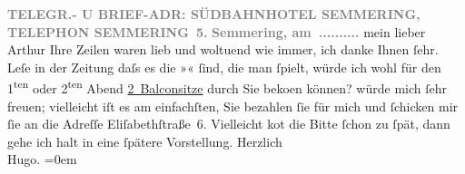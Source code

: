 \begin{ledgroupsized}[t]{13cm}
           \pstart
           \centering{}\textcolor{gray}{\textbf{TELEGR.- U BRIEF-ADR: SÜDBAHNHOTEL SEMMERING, TELEPHON SEMMERING 5.}}\pend
           \pstart
           \noindent{}\raggedleft{}\textcolor{gray}{\textbf{Semmering, am ..........}}\pend
           \pstart{}mein lieber Arthur \pend\pstart
           Ihre Zeilen waren lieb und woltuend wie immer, ich danke Ihnen ſehr.\pend
           \pstart
           Leſe in der Zeitung daſs es die »\label{K_L02053_1v}\label{K_L02053_1h}« ſind, die man ſpielt, würde ich wohl für
               den 1\textsuperscript{ten}{ }{\pb}oder 2\textsuperscript{ten} Abend \uline{2 Balconsitze} durch Sie beko{\geminationm}en können? würde mich ſehr freuen; vielleicht iſt es am
               einfachſten, Sie bezahlen ſie für mich und ſchicken mir ſie an die Adreſſe Eliſabethſtraße 6.\pend
           \pstart
           Vielleicht ko{\geminationm}t die Bitte ſchon zu ſpät, dann gehe ich
               halt in eine ſpätere Vorstellung.\pend
           \pstart
           Herzlich{\\[\baselineskip]}\spacefill\mbox{Hugo.}\pend
           \leftskip=0em{}\endnumbering{}\end{ledgroupsized}  \newcommand{\dateiname}{L02053}\newcommand{\titel}{Hugo von Hofmannsthal an Arthur Schnitzler, [7. 2. 1912]}\newcommand{\editorInnen}{Martin Anton Müller und Gerd-Hermann Susen}
      